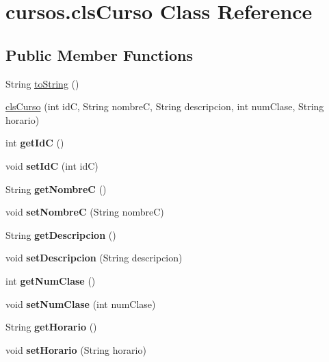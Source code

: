 \hypertarget{classcursos_1_1cls_curso}{}\section{cursos.\+cls\+Curso Class Reference}
\label{classcursos_1_1cls_curso}
\subsection*{Public Member Functions}
\begin{DoxyCompactItemize}
\item 
String \hyperlink{classcursos_1_1cls_curso_a68a6d3a680826cf57ab23fd4609a0cbb}{to\+String} ()
\item 
\hyperlink{classcursos_1_1cls_curso_a10cb1cd33cb4c6c352fde287a982c8c4}{cls\+Curso} (int idC, String nombreC, String descripcion, int num\+Clase, String horario)
\item 
\mbox{\label{classcursos_1_1cls_curso_ae04df129af37f0d53c6cb8fb36961610}} 
int {\bfseries get\+IdC} ()
\item 
\mbox{\label{classcursos_1_1cls_curso_a93ea5fa837509856f6f821c435c5a13a}} 
void {\bfseries set\+IdC} (int idC)
\item 
\mbox{\label{classcursos_1_1cls_curso_ae2b2f792ecf4057c5a2d46f4aa2ad56d}} 
String {\bfseries get\+NombreC} ()
\item 
\mbox{\label{classcursos_1_1cls_curso_a74b9b03335f139bd4294dd231b8d14e9}} 
void {\bfseries set\+NombreC} (String nombreC)
\item 
\mbox{\label{classcursos_1_1cls_curso_a02e3967725fe210989bb433bf8714584}} 
String {\bfseries get\+Descripcion} ()
\item 
\mbox{\label{classcursos_1_1cls_curso_a4d68f612d2f9246166214437897520d2}} 
void {\bfseries set\+Descripcion} (String descripcion)
\item 
\mbox{\label{classcursos_1_1cls_curso_a23d00ece982fa360af1670109608e66c}} 
int {\bfseries get\+Num\+Clase} ()
\item 
\mbox{\label{classcursos_1_1cls_curso_a2c00f90cfb6dc6d5a8cd214b6cbce872}} 
void {\bfseries set\+Num\+Clase} (int num\+Clase)
\item 
\mbox{\label{classcursos_1_1cls_curso_a38797002db9146f33d04069788a0261e}} 
String {\bfseries get\+Horario} ()
\item 
\mbox{\label{classcursos_1_1cls_curso_aeddd82e4cd9e7b98d022b1dd64a97490}} 
void {\bfseries set\+Horario} (String horario)
\end{DoxyCompactItemize}



